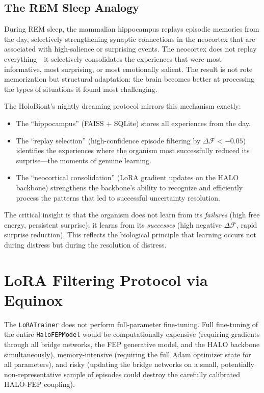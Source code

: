 \subsection{The REM Sleep Analogy}

During REM sleep, the mammalian hippocampus replays episodic memories from the day, selectively strengthening synaptic connections in the neocortex that are associated with high-salience or surprising events. The neocortex does not replay everything---it selectively consolidates the experiences that were most informative, most surprising, or most emotionally salient. The result is not rote memorization but structural adaptation: the brain becomes better at processing the types of situations it found most challenging.

The HoloBiont's nightly dreaming protocol mirrors this mechanism exactly:
\begin{itemize}
    \item The ``hippocampus'' (FAISS + SQLite) stores all experiences from the day.
    \item The ``replay selection'' (high-confidence episode filtering by $\Delta\mathcal{F} < -0.05$) identifies the experiences where the organism most successfully reduced its surprise---the moments of genuine learning.
    \item The ``neocortical consolidation'' (LoRA gradient updates on the HALO backbone) strengthens the backbone's ability to recognize and efficiently process the patterns that led to successful uncertainty resolution.
\end{itemize}

The critical insight is that the organism does not learn from its \textit{failures} (high free energy, persistent surprise); it learns from its \textit{successes} (high negative $\Delta\mathcal{F}$, rapid surprise reduction). This reflects the biological principle that learning occurs not during distress but during the resolution of distress.

\section{LoRA Filtering Protocol via Equinox}

The \texttt{LoRATrainer} does not perform full-parameter fine-tuning. Full fine-tuning of the entire \texttt{HaloFEPModel} would be computationally expensive (requiring gradients through all bridge networks, the FEP generative model, and the HALO backbone simultaneously), memory-intensive (requiring the full Adam optimizer state for all parameters), and risky (updating the bridge networks on a small, potentially non-representative sample of episodes could destroy the carefully calibrated HALO-FEP coupling).

